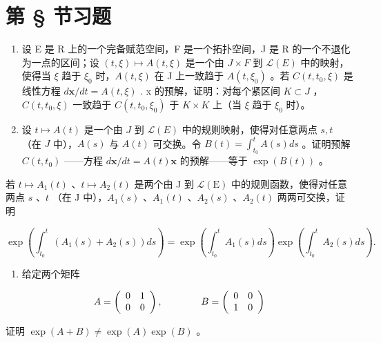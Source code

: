 \section*{第 \S{} 节习题}
{}

\begin{enumerate}
\def\labelenumi{\arabic{enumi})}
\item
  设 E 是 R 上的一个完备赋范空间，F 是一个拓扑空间，J 是 R 的一个不退化为一点的区间；设 \((t, \xi) \mapsto A(t, \xi)\) 是一个由 \(J \times F\) 到 \(\mathcal{L}(E)\) 中的映射，使得当 \(\xi\) 趋于 \(\xi_{0}\) 时，\(A(t, \xi)\) 在 J 上一致趋于 \(A(t, \xi_{0})\) 。若 \(C(t, t_{0}, \xi)\) 是线性方程 \(d\mathbf{x}/dt = A(t, \xi)\) . x 的预解，证明：对每个紧区间 \(K \subset J\) ，\(C(t, t_{0}, \xi)\) 一致趋于 \(C(t, t_{0}, \xi_{0})\) 于 \(K \times K\) 上（当 \(\xi\) 趋于 \(\xi_{0}\) 时）。
\item
  设 \(t \mapsto A(t)\) 是一个由 \(J\) 到 \(\mathcal{L}(E)\) 中的规则映射，使得对任意两点 \(s, t\) （在 \(J\) 中），\(A(s)\) 与 \(A(t)\) 可交换。令 \(B(t) = \int_{t_0}^{t} A(s) ds\) 。证明预解 \(C(t, t_0)\) ——方程 \(d\mathbf{x}/dt = A(t)\mathbf{x}\) 的预解——等于 \(\exp(B(t))\) 。
\end{enumerate}

若 \(t \mapsto A_1(t)\) 、\(t \mapsto A_2(t)\) 是两个由 J 到 \(\mathcal{L}(\mathrm{E})\) 中的规则函数，使得对任意两点 \(s\) 、\(t\) （在 J 中），\(A_1(s)\) 、\(A_1(t)\) 、\(A_2(s)\) 、\(A_2(t)\) 两两可交换，证明

\[
\exp \left(\int_ {t _ {0}} ^ {t} \left(A _ {1} (s) + A _ {2} (s)\right) d s\right) = \exp \left(\int_ {t _ {0}} ^ {t} A _ {1} (s) d s\right) \exp \left(\int_ {t _ {0}} ^ {t} A _ {2} (s) d s\right).
\]

\begin{enumerate}
\def\labelenumi{\arabic{enumi})}
\setcounter{enumi}{2}
\tightlist
\item
  给定两个矩阵
\end{enumerate}

\[
A = \left( \begin{array}{c c} 0 & 1 \\ 0 & 0 \end{array} \right), \qquad \qquad B = \left( \begin{array}{c c} 0 & 0 \\ 1 & 0 \end{array} \right)
\]

证明 \(\exp(A+B)\neq\exp(A)\exp(B)\) 。

